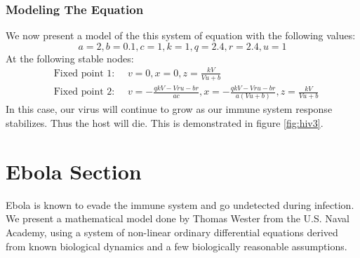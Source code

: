 \documentclass{article}
\begin{document}
\subsubsection{Modeling The Equation}
We now present a model of the this system of equation with the following values:
\begin{equation}
a=2,b= 0.1,c=1,k=1,q= 2.4,r= 2.4,u=1
\end{equation}
At the following stable nodes:
\begin{equation}
\begin{split}
&\text{Fixed point 1: } \quad v=0,x=0,z={\frac {kV}{Vu+b}}   \\
&\text{Fixed point 2: } \quad  v=-{\frac {qkV-Vru-br}{ac}},x=-{\frac {qkV-Vru-br}{a \left( Vu+b \right) }},z={\frac {kV}{Vu+b}}
\end{split}
\label{eq:fixed}
\end{equation}
In this case, our virus will continue to grow as our immune system response stabilizes. Thus the host will die. 
This is demonstrated in figure \ref{fig:hiv3}.




\section{Ebola Section}

Ebola is known to evade the immune system and go undetected during infection. We present a mathematical model done by Thomas Wester from the U.S. Naval Academy, using a system of non-linear ordinary differential equations derived from known biological dynamics and a few biologically reasonable assumptions.
\end{document}
